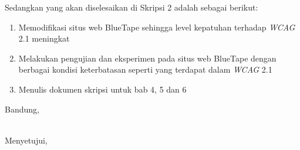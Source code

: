 \documentclass[a4paper,twoside]{article}
\begin{document}
Sedangkan yang akan diselesaikan di Skripsi 2 adalah sebagai berikut:
\begin{enumerate}
\item Memodifikasi situs web BlueTape sehingga level kepatuhan terhadap \textit{WCAG} 2.1 meningkat
\item Melakukan pengujian dan eksperimen pada situs web BlueTape dengan berbagai kondisi keterbatasan seperti yang terdapat dalam \textit{WCAG} 2.1
\item Menulis dokumen skripsi untuk bab 4, 5 dan 6
\end{enumerate}

\vspace{1cm}
\centering Bandung, \tanggal\\
\vspace{2cm} \nama \\ 
\vspace{1cm}

Menyetujui, \\
\end{document}
